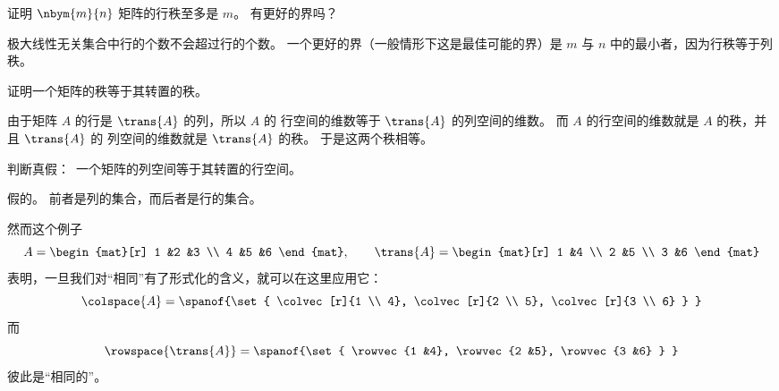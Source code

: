     证明 \( \nbym{m}{n} \) 矩阵的行秩至多是 \( m \)。
    有更好的界吗？
    \begin{answer}
      极大线性无关集合中行的个数不会超过行的个数。
      一个更好的界（一般情形下这是最佳可能的界）是 \( m \) 与 \( n \)
      中的最小者，因为行秩等于列秩。
     \end{answer}
  \item
    证明一个矩阵的秩等于其转置的秩。
    \begin{answer}
      由于矩阵 \( A \) 的行是 \( \trans{A} \) 的列，所以 \( A \) 的
      行空间的维数等于 \( \trans{A} \) 的列空间的维数。
      而 \( A \) 的行空间的维数就是 \( A \) 的秩，并且 \( \trans{A} \) 的
      列空间的维数就是 \( \trans{A} \) 的秩。
      于是这两个秩相等。
    \end{answer}
  \item
    判断真假：~一个矩阵的列空间等于其转置的行空间。
    \begin{answer}
      假的。
      前者是列的集合，而后者是行的集合。

      然而这个例子
      \begin{equation*}
         A=\begin{mat}[r]
             1  &2  &3  \\
             4  &5  &6
           \end{mat},
         \qquad
         \trans{A}=\begin{mat}[r]
             1  &4  \\
             2  &5  \\
             3  &6
           \end{mat}
      \end{equation*}
      表明，一旦我们对“相同”有了形式化的含义，就可以在这里应用它：
      \begin{equation*}
        \colspace{A}=\spanof{\set{
                        \colvec[r]{1 \\ 4},
                        \colvec[r]{2 \\ 5},
                        \colvec[r]{3 \\ 6} }  }
      \end{equation*}
      而
      \begin{equation*}
         \rowspace{\trans{A}}=\spanof{\set{
                                 \rowvec{1 &4},
                                 \rowvec{2 &5},
                                 \rowvec{3 &6} }  }
      \end{equation*}
      彼此是“相同的”。
    \end{answer}
